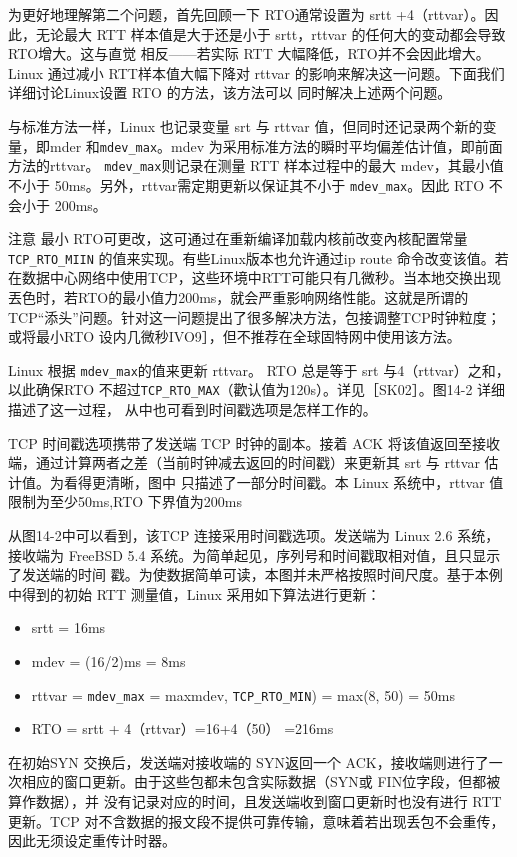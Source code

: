 为更好地理解第二个问题，首先回顾一下 RTO通常设置为 srtt +4（rttvar）。因此，无论最大 RTT 样本值是大于还是小于
srtt，rttvar 的任何大的变动都会导致 RTO增大。这与直觉
相反——若实际 RTT 大幅降低，RTO并不会因此增大。Linux 通过减小 RTT样本值大幅下降对 rttvar
的影响来解决这一问题。下面我们详细讨论Linux设置 RTO 的方法，该方法可以
同时解决上述两个问题。

与标准方法一样，Linux 也记录变量 srt 与 rttvar 值，但同时还记录两个新的变量，即mder
和\verb|mdev_max|。mdev 为采用标准方法的瞬时平均偏差估计值，即前面方法的rttvar。
\verb|mdev_max|则记录在测量 RTT 样本过程中的最大 mdev，其最小值不小于
50ms。另外，rttvar需定期更新以保证其不小于 \verb|mdev_max|。因此 RTO 不会小于 200ms。

注意 最小 RTO可更改，这可通过在重新编译加载内核前改变內核配置常量\verb|TCP_RTO_MIIN|
的值来实现。有些Linux版本也允许通过ip route 命令改变该值。若
在数据中心网络中使用TCP，这些环境中RTT可能只有几微秒。当本地交换出现丟色时，若RTO的最小值力200ms，就会严重影响网络性能。这就是所谓的
TCP“添头”问题。针对这一问题提出了很多解决方法，包接调整TCP时钟粒度；或将最小RTO 设内几微秒IVO9］，但不推荐在全球固特网中使用该方法。

Linux 根据 \verb|mdev_max|的值来更新 rttvar。 RTO 总是等于 srt
与4（rttvar）之和，以此确保RTO 不超过\verb|TCP_RTO_MAX|（歡认值为120s）。详见［SK02］。图14-2 详细描述了这一过程，
从中也可看到时间戳选项是怎样工作的。

TCP 时间戳选项携带了发送端 TCP 时钟的副本。接着 ACK 将该值返回至接收端，通过计算两者之差（当前时钟减去返回的时间戳）来更新其
srt 与 rttvar 估计值。为看得更清晰，图中
只描述了一部分时间戳。本 Linux 系统中，rttvar 值限制为至少50ms,RTO 下界值为200ms

从图14-2中可以看到，该TCP 连接采用时间戳选项。发送端为 Linux 2.6 系统，接收端为 FreeBSD 5.4
系统。为简单起见，序列号和时间戳取相对值，且只显示了发送端的时间
戳。为使数据简单可读，本图并未严格按照时间尺度。基于本例中得到的初始 RTT 测量值，Linux 采用如下算法进行更新：
\begin{itemize}
  \item srtt = 16ms
  \item mdev = (16/2)ms = 8ms
  \item rttvar = \verb|mdev_max| = maxmdev, \verb|TCP_RTO_MIN|) =
  max(8, 50) = 50ms
\item RTO = srtt + 4（rttvar）=16+4（50） =216ms
\end{itemize}

在初始SYN 交换后，发送端对接收端的 SYN返回一个 ACK，接收端则进行了一次相应的窗口更新。由于这些包都未包含实际数据（SYN或
FIN位字段，但都被算作数据），并
没有记录对应的时间，且发送端收到窗口更新时也没有进行 RTT更新。TCP 对不含数据的报文段不提供可靠传输，意味着若出现丢包不会重传，因此无须设定重传计时器。

